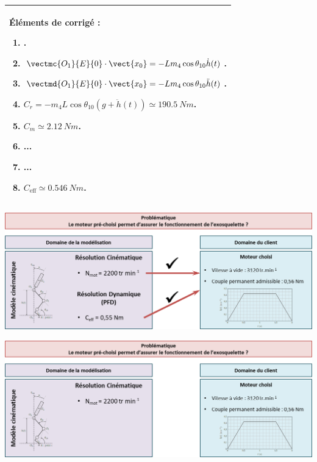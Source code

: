 \begin{multicols}{2}
\noindent 
\footnotesize
\begin{tabular}{|p{.95\linewidth}|}
\hline
Éléments de corrigé :
\begin{enumerate}
\item .
\item $\vectmc{O_1}{E}{0}\cdot \vect{x_0} = -Lm_4\cos\theta_{10}\dot{h}(t)$.
\item $\vectmd{O_1}{E}{0}\cdot\vect{x_0}=-Lm_4\cos\theta_{10}\ddot{h}(t)$.
\item $ C_r=-m_4 L \cos\theta_{10} \left(g+\ddot{h}(t)\right)\simeq \SI{190,5}{Nm} $. 
\item $C_m\simeq \SI{2,12}{Nm}$.
\item ...
\item ...
\item $C_{\text{eff}} \simeq \SI{0,546}{Nm}$.
\end{enumerate} \\
\hline
\end{tabular}
\normalsize
\fi

\ifprof
\else
\end{multicols}
\fi



\ifprof
\begin{center}
\includegraphics[width=\linewidth]{images/cor_02}
\end{center}

\else


\begin{center}
\includegraphics[width=.7\linewidth]{images/fig_15}
\end{center}
\fi



